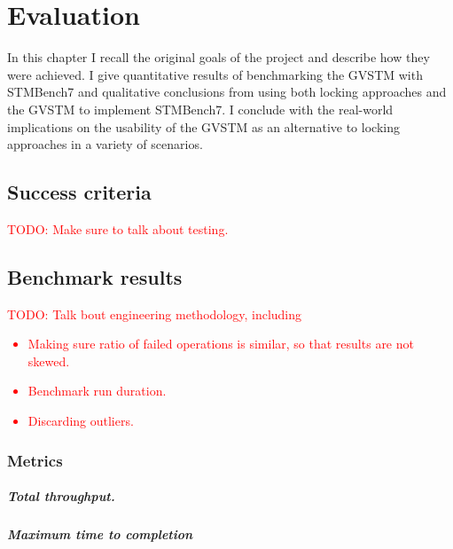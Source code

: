 \documentclass[12pt,a4paper,oneside,openright]{report}
\newcommand{\todo}[1]{\textcolor{red}{TODO: #1}}
\begin{document}

\chapter{Evaluation}

In this chapter I recall the original goals of the project and
describe how they were achieved. I give quantitative results of
benchmarking the GVSTM with STMBench7 and qualitative conclusions from
using both locking approaches and the GVSTM to implement STMBench7. I
conclude with the real-world implications on the usability of the
GVSTM as an alternative to locking approaches in a variety of
scenarios.

\section{Success criteria}
\label{sec:eval:success-criteria}

\todo{Make sure to talk about testing.}

\section{Benchmark results}
\label{sec:eval:benchmark-results}

\todo{Talk bout engineering methodology, including
  \begin{itemize}
  \item Making sure ratio of failed operations is similar, so that
    results are not skewed.
  \item Benchmark run duration.
  \item Discarding outliers.
  \end{itemize}
}

\subsection{Metrics}
\label{sec:eval:metrics}

\paragraph{Total throughput.}

\paragraph{Maximum time to completion}
\end{document}
